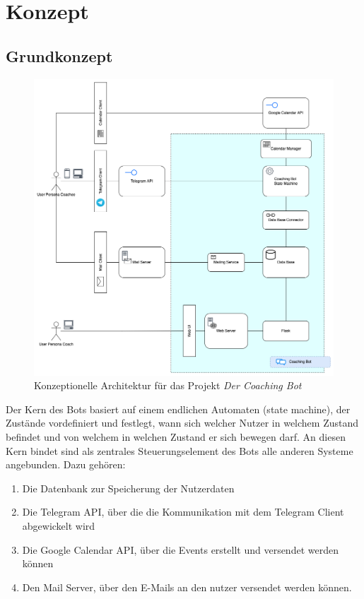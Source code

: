 \label{Konzept}
\chapter{Konzept}

\section{Grundkonzept}

\begin{figure} %
   \centering
   \includegraphics[width=1.0\textwidth]{images/220320_PA28464_Architecture.png}
   \caption{Konzeptionelle Architektur für das Projekt \emph{Der Coaching Bot}}
   \label{fig: Abbildung 1 - Konzeptionelle Architektur für das Projekt "Der Coaching Bot"}
\end{figure}

Der Kern des Bots basiert auf einem endlichen Automaten (state machine), der Zustände vordefiniert und festlegt, wann sich welcher Nutzer in welchem Zustand befindet und von welchem in welchen Zustand er sich bewegen darf. An diesen Kern bindet sind als zentrales Steuerungselement des Bots alle anderen Systeme angebunden. Dazu gehören:
\begin{enumerate}
	\item Die Datenbank zur Speicherung der Nutzerdaten
	\item Die Telegram API, über die die Kommunikation mit dem Telegram Client abgewickelt wird
	\item Die Google Calendar API, über die Events erstellt und versendet werden können
	\item Den Mail Server, über den E-Mails an den nutzer versendet werden können.
\end{enumerate} 

